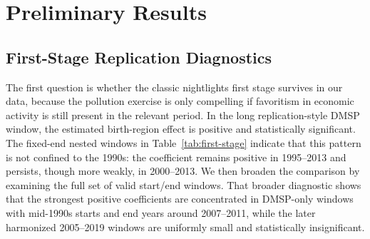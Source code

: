 \documentclass[11pt]{article}
\begin{document}
\section{Preliminary Results}
\subsection{First-Stage Replication Diagnostics}
The first question is whether the classic nightlights first stage survives in our data, because the pollution exercise is only compelling if favoritism in economic activity is still present in the relevant period. In the long replication-style DMSP window, the estimated birth-region effect is positive and statistically significant. The fixed-end nested windows in Table~\ref{tab:first-stage} indicate that this pattern is not confined to the 1990s: the coefficient remains positive in 1995--2013 and persists, though more weakly, in 2000--2013. We then broaden the comparison by examining the full set of valid start/end windows. That broader diagnostic shows that the strongest positive coefficients are concentrated in DMSP-only windows with mid-1990s starts and end years around 2007--2011, while the later harmonized 2005--2019 windows are uniformly small and statistically insignificant.

\begin{table}[h]
\centering
\caption{Nested-window replication diagnostics for the nightlights first stage}
\label{tab:first-stage}
\small
{}
\end{table}
\end{document}
